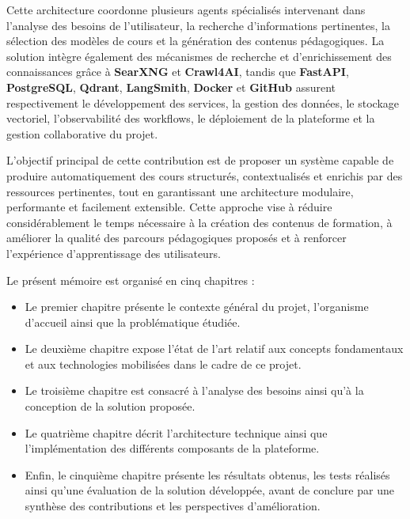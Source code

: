 \documentclass[12pt,a4paper,oneside]{report}
\begin{document}
Cette architecture coordonne plusieurs agents spécialisés intervenant dans l'analyse des besoins de l'utilisateur, la recherche d'informations pertinentes, la sélection des modèles de cours et la génération des contenus pédagogiques. La solution intègre également des mécanismes de recherche et d'enrichissement des connaissances grâce à \textbf{SearXNG} et \textbf{Crawl4AI}, tandis que \textbf{FastAPI}, \textbf{PostgreSQL}, \textbf{Qdrant}, \textbf{LangSmith}, \textbf{Docker} et \textbf{GitHub} assurent respectivement le développement des services, la gestion des données, le stockage vectoriel, l'observabilité des workflows, le déploiement de la plateforme et la gestion collaborative du projet.

L'objectif principal de cette contribution est de proposer un système capable de produire automatiquement des cours structurés, contextualisés et enrichis par des ressources pertinentes, tout en garantissant une architecture modulaire, performante et facilement extensible. Cette approche vise à réduire considérablement le temps nécessaire à la création des contenus de formation, à améliorer la qualité des parcours pédagogiques proposés et à renforcer l'expérience d'apprentissage des utilisateurs.

Le présent mémoire est organisé en cinq chapitres :

\begin{itemize}
    \item Le premier chapitre présente le contexte général du projet, l'organisme d'accueil ainsi que la problématique étudiée.
    \item Le deuxième chapitre expose l'état de l'art relatif aux concepts fondamentaux et aux technologies mobilisées dans le cadre de ce projet.
    \item Le troisième chapitre est consacré à l'analyse des besoins ainsi qu'à la conception de la solution proposée.
    \item Le quatrième chapitre décrit l'architecture technique ainsi que l'implémentation des différents composants de la plateforme.
    \item Enfin, le cinquième chapitre présente les résultats obtenus, les tests réalisés ainsi qu'une évaluation de la solution développée, avant de conclure par une synthèse des contributions et les perspectives d'amélioration.
\end{itemize}


\end{document}

